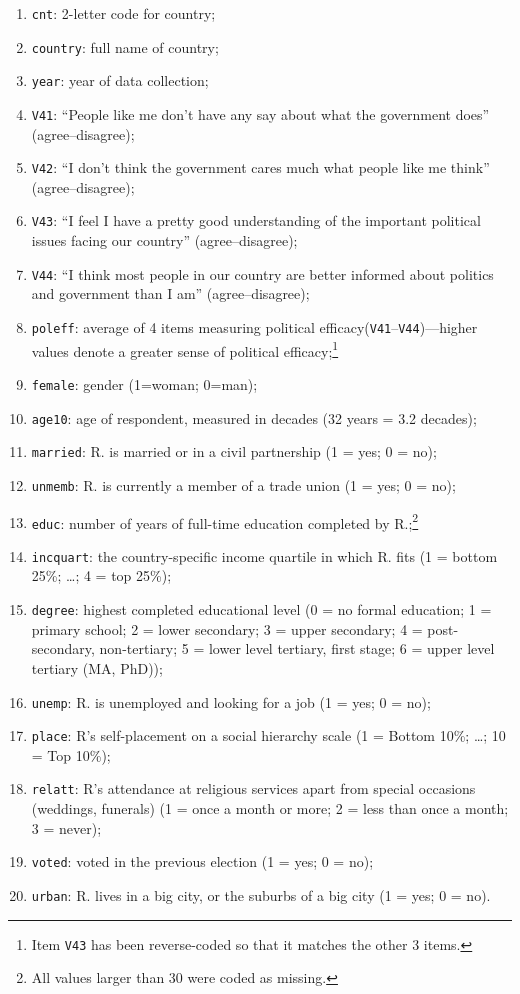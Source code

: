 \documentclass[12pt,english]{article}
\begin{document}
\begin{enumerate}
  \item \texttt{cnt}: 2-letter code for country;
  \item \texttt{country}: full name of country;
  \item \texttt{year}: year of data collection;
  \item \texttt{V41}: ``People like me don't have any say about what the government does'' (agree--disagree);
  \item \texttt{V42}: ``I don't think the government cares much what people like me think'' (agree--disagree);
  \item \texttt{V43}: ``I feel I have a pretty good understanding of the important political issues facing our country'' (agree--disagree);
  \item \texttt{V44}: ``I think most people in our country are better informed about politics and government than I am'' (agree--disagree);
  \item \texttt{poleff}: average of 4 items measuring political efficacy(\texttt{V41}--\texttt{V44})---higher values denote a greater sense of political efficacy;\footnote{Item \texttt{V43} has been reverse-coded so that it matches the other 3 items.}
  \item \texttt{female}: gender (1=woman; 0=man);
  \item \texttt{age10}: age of respondent, measured in decades (32 years = 3.2 decades);
  \item \texttt{married}: R. is married or in a civil partnership (1 = yes; 0 = no);
  \item \texttt{unmemb}: R. is currently a member of a trade union (1 = yes; 0 = no);
  \item \texttt{educ}: number of years of full-time education completed by R.;\footnote{All values larger than 30 were coded as missing.}
  \item \texttt{incquart}: the country-specific income quartile in which R. fits (1 = bottom 25\%; \dots; 4 = top 25\%);
  \item \texttt{degree}: highest completed educational level (0 = no formal education; 1 = primary school; 2 = lower secondary; 3 = upper secondary; 4 = post-secondary, non-tertiary; 5 = lower level tertiary, first stage; 6 = upper level tertiary (MA, PhD));
  \item \texttt{unemp}: R. is unemployed and looking for a job (1 = yes; 0 = no);
  \item \texttt{place}: R's self-placement on a social hierarchy scale (1 = Bottom 10\%; \dots; 10 = Top 10\%);
  \item \texttt{relatt}: R's attendance at religious services apart from special occasions (weddings, funerals) (1 = once a month or more; 2 = less than once a month; 3 = never);
  \item \texttt{voted}: voted in the previous election (1 = yes; 0 = no);
  \item \texttt{urban}: R. lives in a big city, or the suburbs of a big city (1 = yes; 0 = no).
\end{enumerate}
\end{document}
